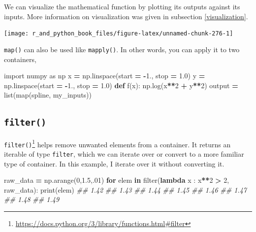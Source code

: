 \documentclass[
  12pt,
  krantz2]{krantz}
\makeatletter
\newenvironment{Shaded}{\begin{snugshade}}{\end{snugshade}}
\newcommand{\BuiltInTok}[1]{#1}
\newcommand{\CommentTok}[1]{\textcolor[rgb]{0.37,0.37,0.37}{\textit{#1}}}
\newcommand{\ControlFlowTok}[1]{\textcolor[rgb]{0.27,0.27,0.27}{\textbf{#1}}}
\newcommand{\DecValTok}[1]{\textcolor[rgb]{0.06,0.06,0.06}{#1}}
\newcommand{\FloatTok}[1]{\textcolor[rgb]{0.06,0.06,0.06}{#1}}
\newcommand{\ImportTok}[1]{#1}
\newcommand{\KeywordTok}[1]{\textcolor[rgb]{0.27,0.27,0.27}{\textbf{#1}}}
\newcommand{\NormalTok}[1]{#1}
\newcommand{\OperatorTok}[1]{\textcolor[rgb]{0.43,0.43,0.43}{\textbf{#1}}}
\renewcommand{\href}[2]{#2\footnote{\url{#1}}}
\newenvironment{kframe}{%
\medskip{}
\setlength{\fboxsep}{.8em}
 \def\at@end@of@kframe{}%
 \ifinner\ifhmode%
  \def\at@end@of@kframe{\end{minipage}}%
  \begin{minipage}{\columnwidth}%
 \fi\fi%
 \def\FrameCommand##1{\hskip\@totalleftmargin \hskip-\fboxsep
 \colorbox{shadecolor}{##1}\hskip-\fboxsep
     \hskip-\linewidth \hskip-\@totalleftmargin \hskip\columnwidth}%
 \MakeFramed {\advance\hsize-\width
   \@totalleftmargin\z@ \linewidth\hsize
   \@setminipage}}%
 {\par\unskip\endMakeFramed%
 \at@end@of@kframe}
\renewenvironment{Shaded}{\begin{kframe}}{\end{kframe}}
\makeatother
\begin{document}
We can visualize the mathematical function by plotting its outputs against its inputs. More information on visualization was given in subsection \ref{visualization}.

\texttt{[image: r\_and\_python\_book\_files/figure-latex/unnamed-chunk-276-1]}

\texttt{map()} can also be used like \texttt{mapply()}. In other words, you can apply it to two containers,

\begin{Shaded}
\begin{Highlighting}[]
\ImportTok{import}\NormalTok{ numpy }\ImportTok{as}\NormalTok{ np}
\NormalTok{x }\OperatorTok{=}\NormalTok{ np.linspace(start }\OperatorTok{=} \OperatorTok{{-}}\FloatTok{1.}\NormalTok{, stop }\OperatorTok{=} \FloatTok{1.0}\NormalTok{)}
\NormalTok{y }\OperatorTok{=}\NormalTok{ np.linspace(start }\OperatorTok{=} \OperatorTok{{-}}\FloatTok{1.}\NormalTok{, stop }\OperatorTok{=} \FloatTok{1.0}\NormalTok{)}
\KeywordTok{def}\NormalTok{ f(x):}
\NormalTok{    np.log(x}\OperatorTok{**}\DecValTok{2} \OperatorTok{+}\NormalTok{ y}\OperatorTok{**}\DecValTok{2}\NormalTok{)}
\NormalTok{output }\OperatorTok{=} \BuiltInTok{list}\NormalTok{(}\BuiltInTok{map}\NormalTok{(spline, my\_inputs))}
\end{Highlighting}
\end{Shaded}

\hypertarget{filter}{%
\subsection{\texorpdfstring{\texttt{filter()}}{filter()}}\label{filter}}

\href{https://docs.python.org/3/library/functions.html\#filter}{\texttt{filter()}} helps remove unwanted elements from a container. It returns an iterable of type \texttt{filter}, which we can iterate over or convert to a more familiar type of container. In this example, I iterate over it without converting it.

\begin{Shaded}
\begin{Highlighting}[]
\NormalTok{raw\_data }\OperatorTok{=}\NormalTok{ np.arange(}\DecValTok{0}\NormalTok{,}\FloatTok{1.5}\NormalTok{,}\FloatTok{.01}\NormalTok{)}
\ControlFlowTok{for}\NormalTok{ elem }\KeywordTok{in} \BuiltInTok{filter}\NormalTok{(}\KeywordTok{lambda}\NormalTok{ x : x}\OperatorTok{**}\DecValTok{2} \OperatorTok{\textgreater{}} \DecValTok{2}\NormalTok{, raw\_data):}
    \BuiltInTok{print}\NormalTok{(elem)}
\CommentTok{\#\# 1.42}
\CommentTok{\#\# 1.43}
\CommentTok{\#\# 1.44}
\CommentTok{\#\# 1.45}
\CommentTok{\#\# 1.46}
\CommentTok{\#\# 1.47}
\CommentTok{\#\# 1.48}
\CommentTok{\#\# 1.49}
\end{Highlighting}
\end{Shaded}
\end{document}
